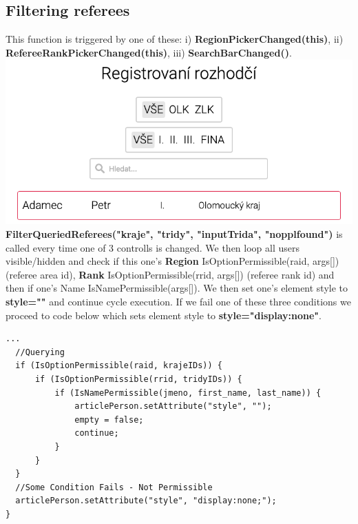 \subsection{Filtering referees}
This function is triggered by one of these: 
\newline i) \textbf{RegionPickerChanged(this)}, 
\newline ii) \textbf{RefereeRankPickerChanged(this)},
\newline iii) \textbf{SearchBarChanged()}.
\newline
\includegraphics[scale=0.541]{img/filtering-preview.png}
\newline
\textbf{FilterQueriedReferees("kraje", "tridy", "inputTrida", "nopplfound")} is called every time one of 3 controlls is changed. We then loop all users visible/hidden and check if this one's \textbf{Region} IsOptionPermissible(raid, args[]) (referee area id), \textbf{Rank} IsOptionPermissible(rrid, args[]) (referee rank id) and then if one's Name IsNamePermissible(args[]). We then set one's element style to \textbf{style=""} and continue cycle execution. If we fail one of these three conditions we proceed to code below which sets element style to \textbf{style="display:none"}.
\begin{lstlisting}
...  
  //Querying
  if (IsOptionPermissible(raid, krajeIDs)) {
      if (IsOptionPermissible(rrid, tridyIDs)) {
          if (IsNamePermissible(jmeno, first_name, last_name)) {
              articlePerson.setAttribute("style", "");
              empty = false;
              continue;
          }
      }
  }
  //Some Condition Fails - Not Permissible
  articlePerson.setAttribute("style", "display:none;");
}  
\end{lstlisting}
